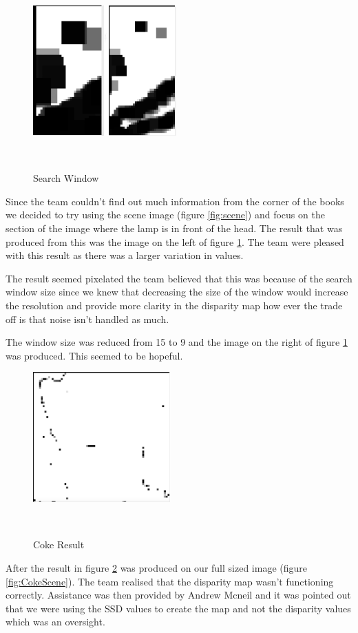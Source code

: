 \documentclass[twocolumn]{article}
\begin{document}
  
\begin{figure}[H]
\centering
  \includegraphics[height=50mm]{Figures/Search_Window_Comparison}
    \caption{Search Window}~\label{fig:Search_Window}
\end{figure} 
Since the team couldn't find out much information from the corner of the books we decided to try using the scene image (figure \ref{fig:scene}) and focus on the section of the image where the lamp is in front of the head. The result that was produced from this was the image on the left of figure \ref{fig:Search_Window}. The team were pleased with this result as there was a larger variation in values. 

The result seemed pixelated the team believed that this was because of the search window size since we knew that decreasing the size of the window would increase the resolution and provide more clarity in the disparity map how ever the trade off is that noise isn't handled as much. 

The window size was reduced from 15 to 9 and the image on the right of figure \ref{fig:Search_Window} was produced. This seemed to be hopeful.

\begin{figure}[H]
\centering
  \includegraphics[height=50mm]{Figures/Coke_Result}
    \caption{Coke Result}~\label{fig:Coke_Result}
\end{figure} 

After the result in figure \ref{fig:Coke_Result} was produced on our full sized image (figure \ref{fig:CokeScene}). The team realised that the disparity map wasn't functioning correctly. Assistance was then provided by Andrew Mcneil and it was pointed out that we were using the SSD values to create the map and not the disparity values which was an oversight.   
\end{document}
